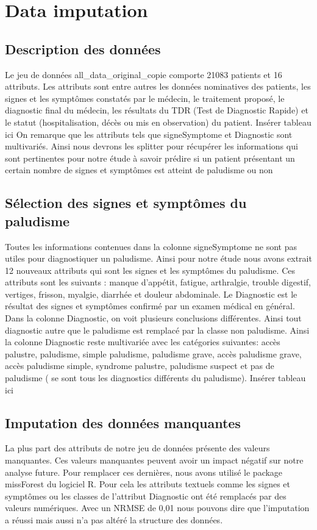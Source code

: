 \section{Data imputation}\label{data_prep}
\subsection{Description des données}
Le jeu de données all_data_original_copie comporte 21083 patients et 16 attributs. Les attributs sont entre autres les données nominatives des patients, les signes et les symptômes constatés par le médecin, le traitement proposé, le diagnostic  final du médecin, les résultats du TDR (Test de Diagnostic Rapide)  et le statut (hospitalisation, décès ou mis en observation) du patient.
Insérer tableau ici
On remarque que les attributs tels que signeSymptome et  Diagnostic sont multivariés. Ainsi nous devrons les splitter pour récupérer les informations qui sont pertinentes pour notre étude à savoir prédire si un patient présentant un certain nombre de signes et symptômes est atteint de paludisme ou non
\subsection{Sélection  des signes et symptômes   du paludisme}
Toutes les informations contenues dans la colonne signeSymptome ne sont pas utiles pour diagnostiquer un  paludisme. Ainsi pour notre étude nous avons extrait 12 nouveaux attributs qui sont les signes et les symptômes du paludisme. Ces attributs sont les suivants : manque d'appétit, fatigue, arthralgie, trouble digestif, vertiges, frisson, myalgie, diarrhée et  douleur abdominale.
Le Diagnostic est le résultat des signes et symptômes confirmé par un examen médical en général. 
Dans la colonne Diagnostic, on voit plusieurs conclusions différentes. Ainsi tout diagnostic autre que le paludisme est remplacé par la classe non paludisme. Ainsi la colonne Diagnostic reste multivariée avec les catégories suivantes: accès palustre, paludisme, simple paludisme, paludisme grave, accès paludisme grave, accès paludisme simple, syndrome palustre, paludisme suspect et pas de paludisme ( se sont tous les diagnostics différents du paludisme).
Insérer tableau ici
\subsection{Imputation des données manquantes}
La plus part des attributs de notre jeu de données présente des valeurs manquantes. Ces valeurs manquantes peuvent avoir un impact négatif sur notre analyse future. Pour remplacer ces dernières, nous avons utilisé le package missForest du logiciel R.
Pour cela les attributs textuels comme les signes et symptômes ou les classes de l’attribut Diagnostic 
ont été remplacés par des valeurs numériques.
 Avec un  NRMSE de 0,01  nous pouvons dire que l’imputation a réussi mais aussi n’a pas altéré 
 la structure des données.
